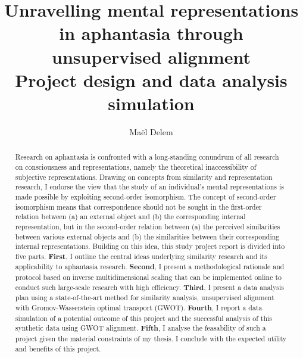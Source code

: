 \documentclass[
  authoryear]{elsarticle}
\begin{document}
\begin{frontmatter}
\title{Unravelling mental representations in aphantasia through
unsupervised alignment \\\large{Project design and data analysis
simulation} }
\author[]{Maël Delem%
%
}


        
\begin{abstract}
Research on aphantasia is confronted with a long-standing conundrum of
all research on consciousness and representations, namely the
theoretical inaccessibility of subjective representations. Drawing on
concepts from similarity and representation research, I endorse the view
that the study of an individual's mental representations is made
possible by exploiting second-order isomorphism. The concept of
second-order isomorphism means that correspondence should not be sought
in the first-order relation between (a) an external object and (b) the
corresponding internal representation, but in the second-order relation
between (a) the perceived similarities between various external objects
and (b) the similarities between their corresponding internal
representations. Building on this idea, this study project report is
divided into five parts. \textbf{First}, I outline the central ideas
underlying similarity research and its applicability to aphantasia
research. \textbf{Second}, I present a methodological rationale and
protocol based on inverse multidimensional scaling that can be
implemented online to conduct such large-scale research with high
efficiency. \textbf{Third}, I present a data analysis plan using a
state-of-the-art method for similarity analysis, unsupervised alignment
with Gromov-Wasserstein optimal transport (GWOT). \textbf{Fourth}, I
report a data simulation of a potential outcome of this project and the
successful analysis of this synthetic data using GWOT alignment.
\textbf{Fifth}, I analyse the feasability of such a project given the
material constraints of my thesis. I conclude with the expected utility
and benefits of this project.
\end{abstract}





\end{frontmatter}
    
\end{document}
